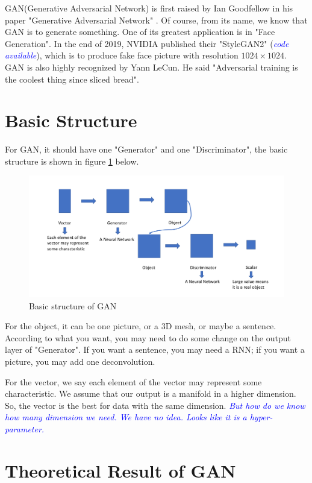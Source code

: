 \documentclass[12pt]{article}
\newcommand{\highlight}[1]{\textcolor{blue}{\textit{#1}}}
\begin{document}
	\MakeScribeTop
GAN(Generative Adversarial Network) is first raised by Ian Goodfellow in his paper "Generative Adversarial Network" \cite{goodfellow2014generative}. Of course, from its name, we know that GAN is to generate something. One of its greatest application is in "Face Generation". In the end of 2019, NVIDIA published their "StyleGAN2" \cite{karras2020analyzing}(\highlight{code available}), which is to produce fake face picture with resolution $1024 \times 1024$. GAN is also highly recognized by Yann LeCun. He said "Adversarial training is the coolest thing since sliced bread".


\section{Basic Structure}
For GAN, it should have one "Generator" and one "Discriminator", the basic structure is shown in figure \ref{fig:basicStructure} below.
\begin{figure}[H]
    \centering
    \includegraphics[width = \textwidth]{basicStructure.pdf}
    \caption{Basic structure of GAN}
    \label{fig:basicStructure}
\end{figure}

For the object, it can be one picture, or a 3D mesh, or maybe a sentence. According to what you want, you may need to do some change on the output layer of "Generator". If you want a sentence, you may need a RNN; if you want a picture, you may add one deconvolution.

For the vector, we say each element of the vector may represent some characteristic. We assume that our output is a manifold in a higher dimension. So, the vector is the best for data with the same dimension. \highlight{But how do we know how many dimension we need. We have no idea. Looks like it is a hyper-parameter.} 

\section{Theoretical Result of GAN}
\end{document}
